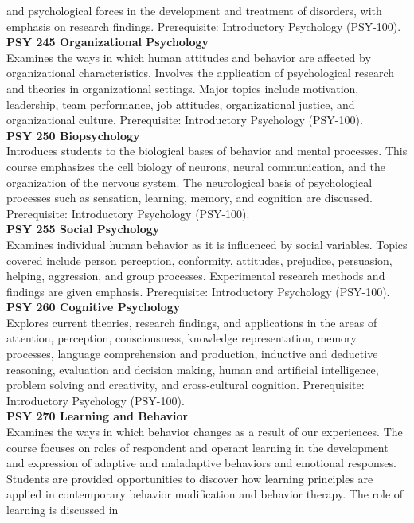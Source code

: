 \documentclass[
  letterpaper,
]{scrbook}
\begin{document}
and psychological forces in the development and treatment of disorders,
with emphasis on research findings. Prerequisite: Introductory
Psychology (PSY-100).\\
\textbf{PSY 245 Organizational Psychology}\\
Examines the ways in which human attitudes and behavior are affected by
organizational characteristics. Involves the application of
psychological research and theories in organizational settings. Major
topics include motivation, leadership, team performance, job attitudes,
organizational justice, and organizational culture. Prerequisite:
Introductory Psychology (PSY-100).\\
\textbf{PSY 250 Biopsychology}\\
Introduces students to the biological bases of behavior and mental
processes. This course emphasizes the cell biology of neurons, neural
communication, and the organization of the nervous system. The
neurological basis of psychological processes such as sensation,
learning, memory, and cognition are discussed. Prerequisite:
Introductory Psychology (PSY-100).\\
\textbf{PSY 255 Social Psychology}\\
Examines individual human behavior as it is influenced by social
variables. Topics covered include person perception, conformity,
attitudes, prejudice, persuasion, helping, aggression, and group
processes. Experimental research methods and findings are given
emphasis. Prerequisite: Introductory Psychology (PSY-100).\\
\textbf{PSY 260 Cognitive Psychology}\\
Explores current theories, research findings, and applications in the
areas of attention, perception, consciousness, knowledge representation,
memory processes, language comprehension and production, inductive and
deductive reasoning, evaluation and decision making, human and
artificial intelligence, problem solving and creativity, and
cross-cultural cognition. Prerequisite: Introductory Psychology
(PSY-100).\\
\textbf{PSY 270 Learning and Behavior}\\
Examines the ways in which behavior changes as a result of our
experiences. The course focuses on roles of respondent and operant
learning in the development and expression of adaptive and maladaptive
behaviors and emotional responses. Students are provided opportunities
to discover how learning principles are applied in contemporary behavior
modification and behavior therapy. The role of learning is discussed in
\end{document}

